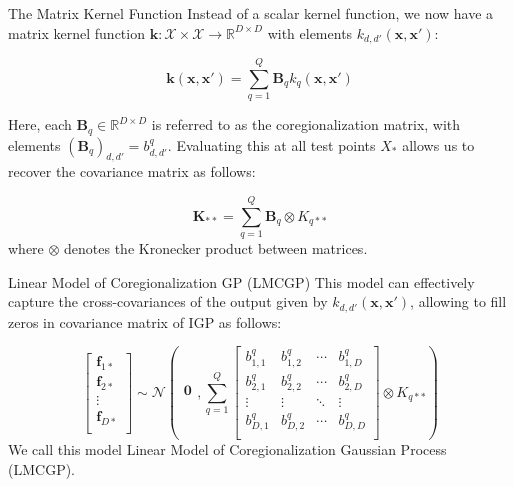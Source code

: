 \begin{frame}{The Matrix Kernel Function}
	Instead of a scalar kernel function, we now have a matrix kernel function $\mathbf{k}: \mathcal{X} \times \mathcal{X} \to \mathbb{R}^{D \times D}$ with elements $k_{d,d'}(\mathbf{x}, \mathbf{x}')$:
	
	\begin{equation}\label{eq:lmc_covariance_function}
		\mathbf{k}(\mathbf{x}, \mathbf{x}') = \sum_{q=1}^Q \mathbf{B}_q k_{q}(\mathbf{x}, \mathbf{x}')
	\end{equation}
	
	Here, each $\mathbf{B}_q \in \mathbb{R}^{D \times D}$ is referred to as the coregionalization matrix, with elements $(\mathbf{B}_q)_{d,d'} = b^q_{d, d'}$. Evaluating this at all test points $X_*$ allows us to recover the covariance matrix as follows:
	
	\begin{equation}
		\mathbf{K}_{**} = \sum_{q=1}^Q \mathbf{B}_q \otimes K_{q**}
	\end{equation}
	where $\otimes$ denotes the Kronecker product between matrices.
\end{frame}

\begin{frame}{Linear Model of Coregionalization GP (LMCGP)}
	This model can effectively capture the cross-covariances of the output given by $k_{d,d'}(\mathbf{x}, \mathbf{x}')$, allowing to fill zeros in covariance matrix of IGP as follows:
	
	\begin{equation*}
		\left[ \begin{array}{c}
			\mathbf{f}_{1*}\\
			\mathbf{f}_{2*}\\
			\vdots\\
			\mathbf{f}_{D*}\\
		\end{array}
		\right]
		\sim
		\mathcal{N} \left(
		\begin{array}{c}
			\mathbf{0}\\
		\end{array},
		\sum_{q=1}^Q
		\left[ \begin{array}{cccccc}
			b^q_{1, 1} & b^q_{1, 2} & \cdots & b^q_{1, D} \\
			b^q_{2, 1} & b^q_{2, 2} & \cdots & b^q_{2, D} \\
			\vdots & \vdots & \ddots & \vdots\\
			b^q_{D, 1} & b^q_{D, 2} & \cdots & b^q_{D, D}\\
		\end{array}
		\right] \otimes K_{q**}\right)
	\end{equation*}
	We call this model Linear Model of Coregionalization Gaussian Process (LMCGP).
\end{frame}

